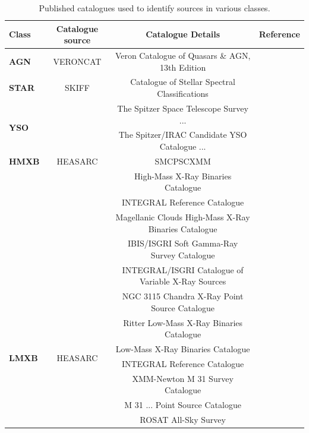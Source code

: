 \documentclass[fleqn,usenatbib]{mnras}
\begin{document}
    \begin{table}
        \centering
        \caption{Published catalogues used to identify sources in various classes.}
        \label{tab:source-cat-detail}
        \begin{tabular}{@{}lccr@{}}
        \toprule
        \textbf{Class} & \textbf{Catalogue source} & \textbf{Catalogue Details} & \textbf{Reference} \\ \midrule
        \textbf{AGN} & VERONCAT & Veron Catalogue of Quasars \& AGN, 13th Edition & \citep{veron2010catalogue} \\
       \textbf{STAR} & SKIFF & Catalogue of Stellar Spectral Classifications & \cite{2013yCat....102023S} \\
       \multirow{2}{*}{\textbf{YSO}} & & The Spitzer Space Telescope Survey ... & \cite{2012AJ....144..192M} \\
         &  & The Spitzer/IRAC Candidate YSO Catalogue ... & \cite{2021ApJS..254...33K} \\
        \textbf{HMXB} & HEASARC & SMCPSCXMM & \cite{sturm2013xmm} \\
         &  & High-Mass X-Ray Binaries Catalogue & \cite{liu2006catalogue} \\
         &  & INTEGRAL Reference Catalogue & \cite{ebisawa2003high} \\
         &  & Magellanic Clouds High-Mass X-Ray Binaries Catalogue & \cite{liu2005meg} \\
         &  & IBIS/ISGRI Soft Gamma-Ray Survey Catalogue  & \cite{hmxb-bird-2016}\\
         &  & INTEGRAL/ISGRI Catalogue of Variable X-Ray Sources & \cite{hmxb-tel-2010} \\
        \multirow{15}{*}{\textbf{LMXB}} & \multirow{15}{*}{HEASARC} & NGC 3115 Chandra X-Ray Point Source Catalogue & \cite{lmxb-ngc-3115} \\
         &  & Ritter Low-Mass X-Ray Binaries Catalogue  & \cite{lmxb-ritter-2003} \\
         &  & Low-Mass X-Ray Binaries Catalogue  & \cite{lmxb-liu-2007} \\
         &  & INTEGRAL Reference Catalogue  & \cite{ebisawa2003high}  \\
         &  & XMM-Newton M 31 Survey Catalogue  & \cite{lmxb-xmm-2005} \\
         &  & M 31 ... Point Source Catalogue & \cite{lmxb-m31-2013} \\
         &  & ROSAT All-Sky Survey & \cite{lmxb-rosat-2009} \\

\end{tabular}
\end{table}
\end{document}
